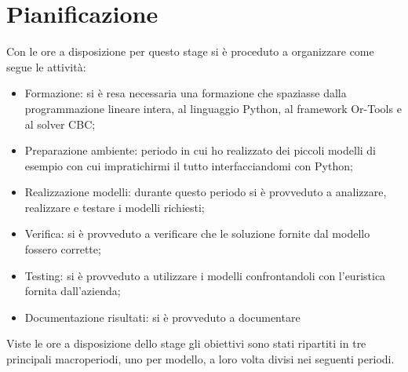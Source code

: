 \section{Pianificazione}
Con le ore a disposizione per questo stage si è proceduto a organizzare come segue le attività:
\begin{itemize}
    \item Formazione: si è resa necessaria una formazione che spaziasse dalla programmazione lineare intera, al linguaggio Python, al framework Or-Tools e al solver CBC;
    \item Preparazione ambiente: periodo in cui ho realizzato dei piccoli modelli di esempio con cui impratichirmi il tutto interfacciandomi con Python;
    \item Realizzazione modelli: durante questo periodo si è provveduto a analizzare, realizzare e testare i modelli richiesti;
    \item Verifica: si è provveduto a verificare che le soluzione fornite dal modello fossero corrette;
    \item Testing: si è provveduto a utilizzare i modelli confrontandoli con l'euristica fornita dall'azienda;
    \item Documentazione risultati: si è provveduto a documentare  
\end{itemize}
Viste le ore a disposizione dello stage gli obiettivi sono stati ripartiti in tre principali macroperiodi, uno per modello, a loro volta divisi nei seguenti periodi.
